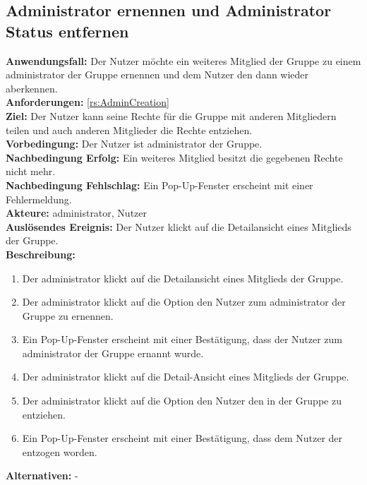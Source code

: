 \documentclass[parskip=full]{scrartcl}
\begin{document}
\subsection{Administrator ernennen und Administrator Status entfernen}
\textbf{Anwendungsfall:} Der Nutzer möchte ein weiteres Mitglied der Gruppe zu einem \gls{administrator} der Gruppe ernennen und dem Nutzer den  dann wieder aberkennen.\\
\textbf{Anforderungen:} \ref{rs:AdminCreation}\\
\textbf{Ziel:} Der Nutzer kann seine Rechte für die Gruppe mit anderen Mitgliedern teilen und auch anderen Mitglieder die Rechte entziehen.\\
\textbf{Vorbedingung:} Der Nutzer ist \gls{administrator} der Gruppe.\\
\textbf{Nachbedingung Erfolg:} Ein weiteres Mitglied besitzt die gegebenen Rechte nicht mehr.\\
\textbf{Nachbedingung Fehlschlag:} Ein Pop-Up-Fenster erscheint mit einer Fehlermeldung.\\
\textbf{Akteure:} \gls{administrator}, Nutzer \\
\textbf{Auslösendes Ereignis:} Der Nutzer klickt auf die Detailansicht eines Mitglieds der Gruppe.\\
\textbf{Beschreibung:}
\begin{enumerate}
    \item Der \gls{administrator} klickt auf die Detailansicht eines Mitglieds der Gruppe.
    \item Der \gls{administrator} klickt auf die Option den Nutzer zum \gls{administrator} der Gruppe zu ernennen.
    \item Ein Pop-Up-Fenster erscheint mit einer Bestätigung, dass der Nutzer zum \gls{administrator} der Gruppe ernannt wurde.
    \item Der \gls{administrator} klickt auf die Detail-Ansicht eines Mitglieds der Gruppe.
    \item Der \gls{administrator} klickt auf die Option den Nutzer den  in der Gruppe zu entziehen.
    \item Ein Pop-Up-Fenster erscheint mit einer Bestätigung, dass dem Nutzer der  entzogen worden.
\end{enumerate}
\textbf{Alternativen:} -
\newpage
\end{document}
